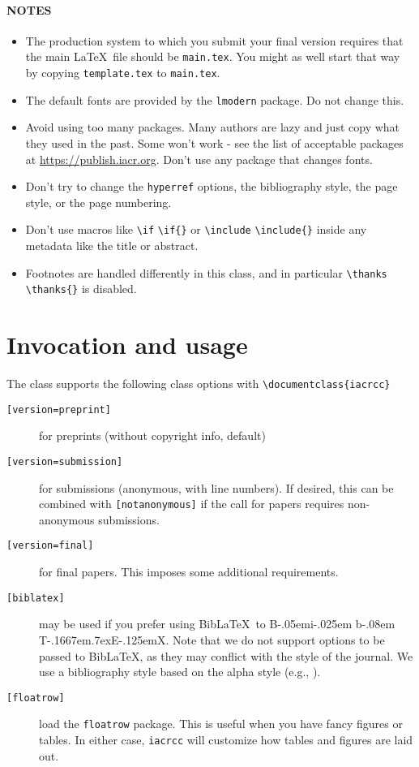 \documentclass{iacrcc}
\newcommand{\cmd}[2][]{%
  \def\FirstArg{#1}
  \ifx\FirstArg\empty
    \texttt{\textbackslash{}#2}%
  \else
    \texttt{\textbackslash{}#2\{#1\}}%
  \fi
}
\def\BibTeX{{\rm B\kern-.05em{\sc i\kern-.025em b}\kern-.08em
    T\kern-.1667em\lower.7ex\hbox{E}\kern-.125emX}}
\def\BibLaTeX{Bib\LaTeX}
\begin{document}
\paragraph*{NOTES}
\begin{itemize}
\item The production system to which you submit your final version requires
  that the main \LaTeX\ file should be \texttt{main.tex}. You might as
  well start that way by copying \texttt{template.tex} to \texttt{main.tex}.
\item The default fonts are provided by the \verb+lmodern+ package. Do not
  change this.
\item Avoid using too many packages. Many authors are lazy and just
  copy what they used in the past. Some won't work - see the list of
  acceptable packages at \url{https://publish.iacr.org}. Don't use any
  package that changes fonts.
\item Don't try to change the \texttt{hyperref} options, the bibliography style,
  the page style, or the page numbering.
\item Don't use macros like \cmd{if} or \cmd{include} inside any
  metadata like the title or abstract.
\item Footnotes are handled differently in this class, and in
  particular \cmd{thanks} is disabled.
\end{itemize}

\section{Invocation and usage}

The class supports the following class options with \verb+\documentclass{iacrcc}+
\begin{description}
\item[\texttt{[version=preprint]}] for preprints (without copyright info, default)
\item[\texttt{[version=submission]}] for submissions (anonymous, with
  line numbers).  If desired, this can be combined with
  \texttt{[notanonymous]} if the call for papers requires
  non-anonymous submissions.
\item[\texttt{[version=final]}] for final papers. This imposes some
  additional requirements.
\item[\texttt{[biblatex]}] may be used if you prefer using
  \BibLaTeX\ to \BibTeX. Note that we do not support options to be
  passed to \BibLaTeX, as they may conflict with the style of the journal. We use
  a bibliography style based on the alpha style (e.g., \cite{RSA78}).
\item[\texttt{[floatrow]}] load the \texttt{floatrow} package. This is useful
  when you have fancy figures or tables. In either case, \texttt{iacrcc}
  will customize how tables and figures are laid out.
\end{description}
\end{document}
